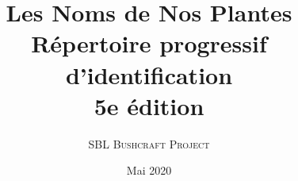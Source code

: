 \pretitle{{\vskip 2cm} \centering\huge}
\posttitle{\par\vskip 1.25cm}
\preauthor{\centering\large}
\postauthor{\par}
\predate{\par\centering\vskip 0.5cm}
\postdate{\par\vskip 1cm\vfill}

\title{%
  {\bfseries Les Noms de Nos Plantes}\\[.25em]
  {\large Répertoire progressif d'identification}\\[.25em]
  {\Large 5e édition}}
\author{{\Large\scshape SBL Bushcraft Project}}
\date{Mai 2020}

\newcommand{\mytitlepage}{%
  \pagenumbering{gobble}
   \begin{titlingpage}
     \maketitle
    \thispagestyle{plain}
     \clearpage 
         {\centering
           {\par\noindent\large\itshape
             Nomina si nescis, perit et cognitio rerum.}
           \medskip
               {\par\hfill ---Linné 1775}}
         \vfill
             {\par\noindent\large © SBL Bushcraft Project 2020}
   \end{titlingpage}
   \pagenumbering{arabic}
}
